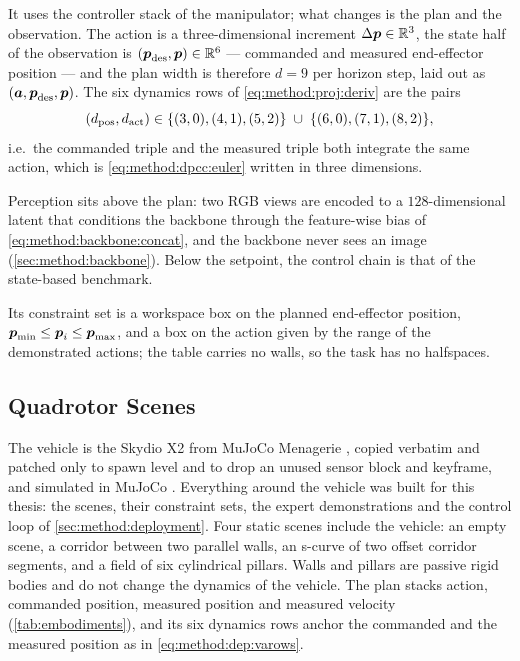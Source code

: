 It uses the controller stack of the manipulator; what changes is the plan and the observation. The action is a three-dimensional increment $\Delta\boldsymbol{p}\in\mathbb{R}^{3}$, the state
half of the observation is $(\boldsymbol{p}_{\textrm{des}},\boldsymbol{p})\in\mathbb{R}^{6}$ --- commanded and measured
end-effector position --- and the plan width is therefore $d = 9$ per horizon step, laid out as
$(\boldsymbol{a},\boldsymbol{p}_{\textrm{des}},\boldsymbol{p})$. The six dynamics rows of
\eqref{eq:method:proj:deriv} are the pairs
\begin{equation}\label{eq:method:dep:varows}
  \left(d_{\textrm{pos}},d_{\textrm{act}}\right) \in
  \{(3,0),(4,1),(5,2)\}\;\cup\;\{(6,0),(7,1),(8,2)\},
\end{equation}
i.e.\ the commanded triple and the measured triple both integrate the same action, which is
\eqref{eq:method:dpcc:euler} written in three dimensions.

Perception sits above the plan: two RGB views are encoded to a $128$-dimensional latent that
conditions the backbone through the feature-wise bias of \eqref{eq:method:backbone:concat}, and the
backbone never sees an image (\autoref{sec:method:backbone}). Below the setpoint, the control chain is
that of the state-based benchmark.

Its constraint set is a workspace box on the planned end-effector position,
$\boldsymbol{p}_{\textrm{min}}\le\boldsymbol{p}_{i}\le\boldsymbol{p}_{\textrm{max}}$, and a box on the action given by the range of
the demonstrated actions; the table carries no walls, so the task has no halfspaces.

\subsection{Quadrotor Scenes}\label{sec:method:env:uav}

The vehicle is the Skydio X2 from MuJoCo Menagerie \parencite{zakka2022menagerie}, copied verbatim and
patched only to spawn level and to drop an unused sensor block and keyframe, and simulated in MuJoCo
\parencite{todorov2012mujoco}. Everything around the vehicle was built for this thesis: the scenes,
their constraint sets, the expert demonstrations and the control loop of \autoref{sec:method:deployment}.
Four static scenes include the vehicle: an empty scene, a corridor between two parallel walls, an
s-curve of two offset corridor segments, and a field of six cylindrical pillars. Walls and pillars are passive rigid bodies and do not change the dynamics of the
vehicle. The plan stacks action, commanded position, measured position and measured velocity
(\autoref{tab:embodiments}), and its six dynamics rows anchor the commanded and the measured position as
in \eqref{eq:method:dep:varows}.

